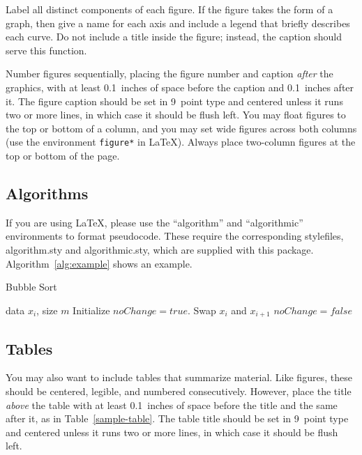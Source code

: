 \documentclass{article}
\begin{document}
Label all distinct components of each figure. If the figure takes the
form of a graph, then give a name for each axis and include a legend
that briefly describes each curve. Do not include a title inside the
figure; instead, the caption should serve this function.

Number figures sequentially, placing the figure number and caption
\emph{after} the graphics, with at least 0.1~inches of space before
the caption and 0.1~inches after it. The figure caption should be set in
9~point type and centered unless it runs two or more lines, in which
case it should be flush left. You may float figures to the top or
bottom of a column, and you may set wide figures across both columns
(use the environment \texttt{figure*} in \LaTeX). Always place
two-column figures at the top or bottom of the page.

\subsection{Algorithms}

If you are using \LaTeX, please use the ``algorithm'' and ``algorithmic''
environments to format pseudocode. These require
the corresponding stylefiles, algorithm.sty and
algorithmic.sty, which are supplied with this package.
Algorithm~\ref{alg:example} shows an example.

\begin{algorithm}[tb]
   \caption{Bubble Sort}
   \label{alg:example}
\begin{algorithmic}
    data $x_i$, size $m$
   \REPEAT
   \STATE Initialize $noChange = true$.
   \STATE Swap $x_i$ and $x_{i+1}$
   \STATE $noChange = false$
   \ENDIF
   \ENDFOR
\end{algorithmic}
\end{algorithm}

\subsection{Tables}

You may also want to include tables that summarize material. Like
figures, these should be centered, legible, and numbered consecutively.
However, place the title \emph{above} the table with at least
0.1~inches of space before the title and the same after it, as in
Table~\ref{sample-table}. The table title should be set in 9~point
type and centered unless it runs two or more lines, in which case it
should be flush left.
\end{document}
